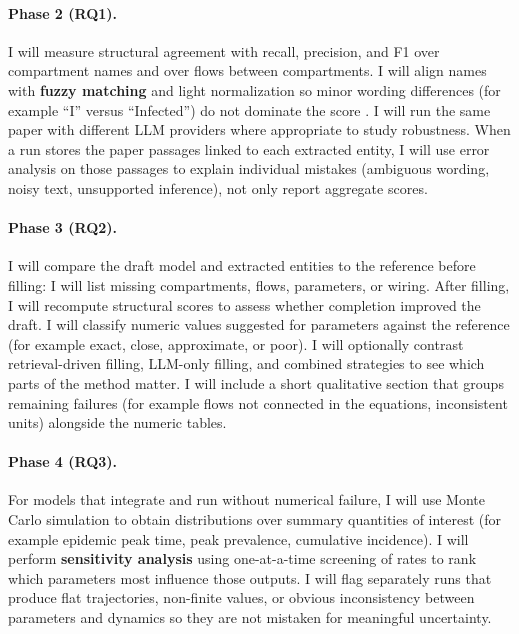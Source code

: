 \documentclass[a4paper,12pt]{article}
\begin{document}
\paragraph{Phase 2 (RQ1).}
I will measure structural agreement with recall, precision, and F1 over compartment names and over flows between compartments. I will align names with \textbf{fuzzy matching} and light normalization so minor wording differences (for example ``I'' versus ``Infected'') do not dominate the score \citep{python_difflib}. I will run the same paper with different LLM providers where appropriate to study robustness. When a run stores the paper passages linked to each extracted entity, I will use error analysis on those passages to explain individual mistakes (ambiguous wording, noisy text, unsupported inference), not only report aggregate scores.

\paragraph{Phase 3 (RQ2).}
I will compare the draft model and extracted entities to the reference before filling: I will list missing compartments, flows, parameters, or wiring. After filling, I will recompute structural scores to assess whether completion improved the draft. I will classify numeric values suggested for parameters against the reference (for example exact, close, approximate, or poor). I will optionally contrast retrieval-driven filling, LLM-only filling, and combined strategies to see which parts of the method matter. I will include a short qualitative section that groups remaining failures (for example flows not connected in the equations, inconsistent units) alongside the numeric tables.

\paragraph{Phase 4 (RQ3).}
For models that integrate and run without numerical failure, I will use Monte Carlo simulation to obtain distributions over summary quantities of interest (for example epidemic peak time, peak prevalence, cumulative incidence). I will perform \textbf{sensitivity analysis} using one-at-a-time screening of rates \citep{morris1991factorial} to rank which parameters most influence those outputs. I will flag separately runs that produce flat trajectories, non-finite values, or obvious inconsistency between parameters and dynamics so they are not mistaken for meaningful uncertainty.
\end{document}
